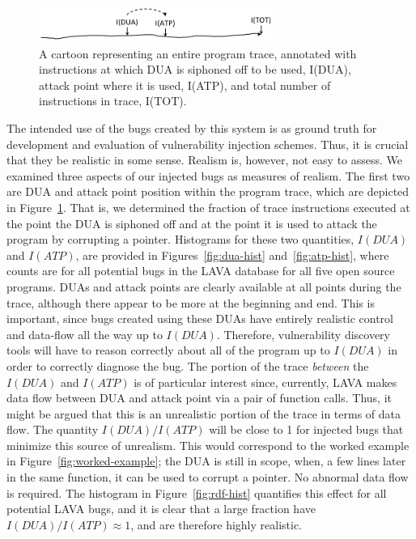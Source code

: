 \begin{figure}
\centering
\includegraphics[width=3in]{trace-dua-atp.png}
\caption{A cartoon representing an entire program trace, annotated with instructions at which DUA is siphoned off to be used, I(DUA), attack point where it is used, I(ATP), and total number of instructions in trace, I(TOT).}
\label{fig:dua-atp-trace}
\end{figure}

The intended use of the bugs created by this system is as ground truth for development and evaluation of vulnerability injection schemes.
Thus, it is crucial that they be realistic in some sense.  
Realism is, however, not easy to assess.
We examined three aspects of our injected bugs as measures of realism. 
The first two are DUA and attack point position within the program trace, which are depicted in Figure~\ref{fig:dua-atp-trace}.
That is, we determined the fraction of trace instructions executed at the point the DUA is siphoned off and at the point it is used to attack the program by corrupting a pointer.
Histograms for these two quantities, $I(DUA)$ and $I(ATP)$, are provided in Figures~\ref{fig:dua-hist} and~\ref{fig:atp-hist}, where counts are for all potential bugs in the LAVA database for all five open source programs. 
DUAs and attack points are clearly available at all points during the trace, although there appear to be more at the beginning and end.
This is important, since bugs created using these DUAs have entirely realistic control and data-flow all the way up to $I(DUA)$.
Therefore, vulnerability discovery tools will have to reason correctly about all of the program up to $I(DUA)$ in order to correctly diagnose the bug.
The portion of the trace \emph{between} the $I(DUA)$ and $I(ATP)$ is of particular interest since, currently, LAVA makes data flow between DUA and attack point via a pair of function calls.
Thus, it might be argued that this is an unrealistic portion of the trace in terms of data flow.
The quantity $I(DUA)/I(ATP)$ will be close to 1 for injected bugs that minimize this source of unrealism.
This would correspond to the worked example in Figure~\ref{fig:worked-example}; the DUA is still in scope, when, a few lines later in the same function, it can be used to corrupt a pointer.
No abnormal data flow is required.
The histogram in Figure~\ref{fig:rdf-hist} quantifies this effect for all potential LAVA bugs, and it is clear that a large fraction have $I(DUA)/I(ATP) \approx 1$, and are therefore highly realistic.

